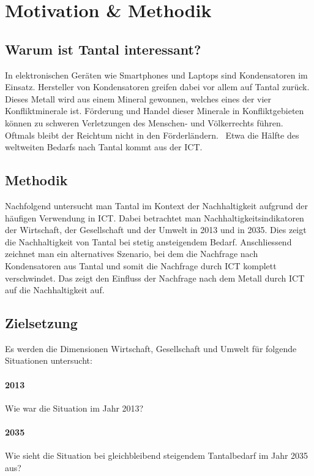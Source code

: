 \section{Motivation \& Methodik}\label{sec:motivation}

\subsection{Warum ist Tantal interessant?}

In elektronischen Geräten wie Smartphones und Laptops sind Kondensatoren im Einsatz.
Hersteller von Kondensatoren greifen dabei vor allem auf Tantal zurück. Dieses Metall wird aus einem Mineral gewonnen, welches eines der vier Konfliktminerale ist.
Förderung und Handel dieser Minerale in Konfliktgebieten können zu schweren Verletzungen des Menschen- und Völkerrechts führen. Oftmals bleibt der Reichtum nicht in den Förderländern.~\cite{conflict_minerals}
Etwa die Hälfte des weltweiten Bedarfs nach Tantal kommt aus der ICT.~\cite{why_tantal}

\subsection{Methodik}

Nachfolgend untersucht man Tantal im Kontext der Nachhaltigkeit aufgrund der häufigen Verwendung in ICT. Dabei betrachtet man Nachhaltigkeitsindikatoren der Wirtschaft, der Gesellschaft und der Umwelt in 2013 und in 2035. Dies zeigt die Nachhaltigkeit von Tantal bei stetig ansteigendem Bedarf.
Anschliessend zeichnet man ein alternatives Szenario, bei dem die Nachfrage nach Kondensatoren aus Tantal und somit die Nachfrage durch ICT komplett verschwindet. Das zeigt den Einfluss der Nachfrage nach dem Metall durch ICT auf die Nachhaltigkeit auf.

\subsection{Zielsetzung}

Es werden die Dimensionen Wirtschaft, Gesellschaft und Umwelt für folgende Situationen untersucht:

\paragraph{2013}
Wie war die Situation im Jahr 2013?
\paragraph{2035}
Wie sieht die Situation bei gleichbleibend steigendem Tantalbedarf im Jahr 2035 aus?
